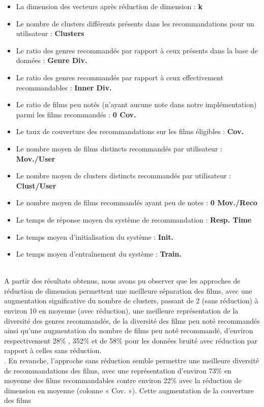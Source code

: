 \documentclass{article}
\begin{document}
\begin{itemize}
    \item La dimension des vecteurs après réduction de dimension : \textbf{k}
    \item Le nombre de clusters différents présents dans les recommandations pour un utilisateur : \textbf{Clusters}
    \item Le ratio des genres recommandés par rapport à ceux présents dans la base de données : \textbf{Genre Div.}
    \item Le ratio des genres recommandés par rapport à ceux effectivement recommandables : \textbf{Inner Div.}
    \item Le ratio de films peu notés (n'ayant aucune note dans notre implémentation) parmi les films recommandés : \textbf{0 Cov.}
    \item Le taux de couverture des recommandations sur les films éligibles : \textbf{Cov.}
    \item Le nombre moyen de films distincts recommandés par utilisateur : \textbf{Mov./User}
    \item Le nombre moyen de clusters distincts recommandés par utilisateur : \textbf{Clust/User}
    \item Le nombre moyen de films recommandés ayant peu de notes : \textbf{0 Mov./Reco}
    \item Le temps de réponse moyen du système de recommandation : \textbf{Resp. Time}
    \item Le temps moyen d’initialisation du système : \textbf{Init.}
    \item Le temps moyen d’entraînement du système : \textbf{Train.}
\end{itemize}
$ $\\
A partir des résultats obtenus, nous avons pu observer que les approches de réduction de dimension permettent une meilleure séparation des films, avec une augmentation significative du nombre de clusters, passant de 2 (sans réduction) à environ 10 en moyenne (avec réduction), 
une meilleure représentation de la diversité des genres recommandés, de la diversité des films peu noté recommandés ainsi qu'une augmentation du nombre de films peu noté recommandé, d'environ respectivement 28\% , 352\% et de 58\% pour les données bruité avec réduction par rapport à celles sans réduction.\\. 
En revanche, l'approche sans réduction semble permettre une meilleure diversité de recommandations des films, avec une représentation d'environ 73\% en moyenne des films recommandables contre environ 22\% avec la réduction de dimension en moyenne (colonne « Cov. »). Cette augmentation de la couverture des films 
\end{document}
